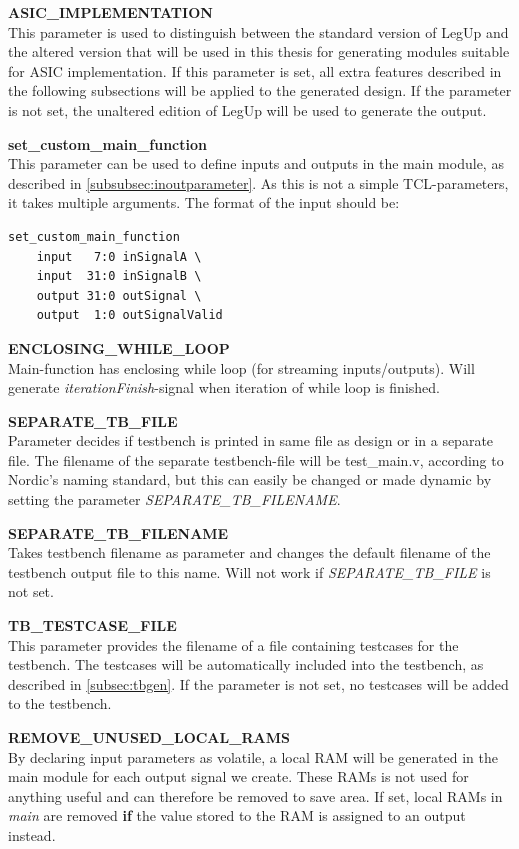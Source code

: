 \begin{description}
\item{\textbf{ASIC\_IMPLEMENTATION}} \hfill \\
This parameter is used to distinguish between the standard version of LegUp and the altered version that will be used in this thesis for generating modules suitable for ASIC implementation. If this parameter is set, all extra features described in the following subsections will be applied to the generated design. If the parameter is not set, the unaltered edition of LegUp will be used to generate the output.
\item{\textbf{set\_custom\_main\_function}} \hfill \\
This parameter can be used to define inputs and outputs in the main module, as described in \cref{subsubsec:inoutparameter}. As this is not a simple TCL-parameters, it takes multiple arguments. The format of the input should be:
\begin{verbatim}
set_custom_main_function 
    input   7:0 inSignalA \
    input  31:0 inSignalB \
    output 31:0 outSignal \
    output  1:0 outSignalValid
\end{verbatim}
\item{\textbf{ENCLOSING\_WHILE\_LOOP}} \hfill \\
Main-function has enclosing while loop (for streaming inputs/outputs). Will generate \textit{iterationFinish}-signal when iteration of while loop is finished.
\item{\textbf{SEPARATE\_TB\_FILE}} \hfill \\
Parameter decides if testbench is printed in same file as design or in a separate file. The filename of the separate testbench-file will be test\_main.v, according to Nordic's naming standard, but this can easily be changed or made dynamic by setting the parameter \textit{SEPARATE\_TB\_FILENAME}.
\item{\textbf{SEPARATE\_TB\_FILENAME}} \hfill \\
Takes testbench filename as parameter and changes the default filename of the testbench output file to this name. Will not work if \textit{SEPARATE\_TB\_FILE} is not set.
\item{\textbf{TB\_TESTCASE\_FILE}} \hfill \\
This parameter provides the filename of a file containing testcases for the testbench. The testcases will be automatically included into the testbench, as described in \cref{subsec:tbgen}. If the parameter is not set, no testcases will be added to the testbench.
\item{\textbf{REMOVE\_UNUSED\_LOCAL\_RAMS}} \hfill \\
By declaring input parameters as volatile, a local RAM will be generated in the main module for each output signal we create. These RAMs is not used for anything useful and can therefore be removed to save area. If set, local RAMs in \textit{main} are removed \textbf{if} the value stored to the RAM is assigned to an output instead.
\end{description}


